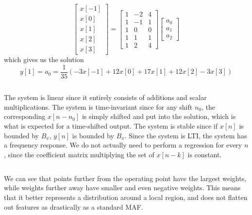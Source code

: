\documentclass{article}
\begin{document}
\begin{equation}
    \begin{bmatrix}
        x[-1] \\
        x[0] \\
        x[1] \\
        x[2] \\
        x[3]
    \end{bmatrix}
    = 
    \begin{bmatrix}
        1 & -2 & 4 \\
        1 & -1 & 1 \\
        1 & 0 & 0 \\
        1 & 1 & 1 \\
        1 & 2 & 4
    \end{bmatrix}
    \begin{bmatrix}
        a_0 \\
        a_1 \\
        a_2
    \end{bmatrix}
\end{equation}
which gives us the solution
\begin{equation}
    y[1] = a_0 = \frac{1}{35} (-3x[-1] + 12x[0] + 17x[1] + 12x[2] - 3x[3])
\end{equation}

\subsection{}

The system is linear since it entirely consists of additions and scalar multiplications.
The system is time-invariant since for any shift \(n_0\), the corresponding \(x[n - n_0]\) is simply shifted and put into the solution, which is what is expected for a time-shifted output.
The system is stable since if \(x[n]\) is bounded by \(B_x\), \(y[n]\) is bounded by \(B_x\).
Since the system is LTI, the system has a frequency response.
We do not actually need to perform a regression for every \(n\), since the coefficient matrix multiplying the set of \(x[n - k]\) is constant.

\subsection{}

We can see that points further from the operating point have the largest weights, while weights further away have smaller and even negative weights.
This means that it better represents a distribution around a local region, and does not flatten out features as drastically as a standard MAF.
\end{document}
